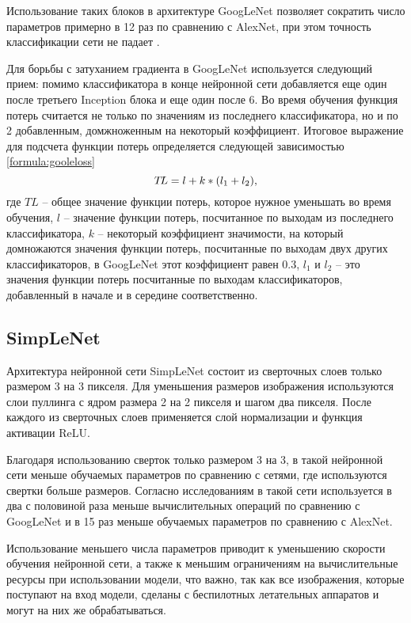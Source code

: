 Использование таких блоков в архитектуре GoogLeNet позволяет сократить число параметров примерно в 12 раз по сравнению с AlexNet, при этом точность классификации сети не падает \cite{googlenet}.

Для борьбы с затуханием градиента в GoogLeNet используется следующий прием: помимо классификатора в конце нейронной сети добавляется еще один после третьего Inception блока и еще один после 6. Во время обучения функция потерь считается не только по значениям из последнего классификатора, но и по 2 добавленным, домжноженным на некоторый коэффициент. Итоговое выражение для подсчета функции потерь определяется следующей зависимостью \ref{formula:gooleloss}
\begin{equation}\label{formula:gooleloss}
T\!L = l + k * (l_{\rm{1}} + l_{\rm{2}}),
\end{equation}
где $T\!L$ -- общее значение функции потерь, которое нужное уменьшать во время обучения, $l$ -- значение функции потерь, посчитанное по выходам из последнего классификатора, $k$ -- некоторый коэффициент значимости, на который домножаются значения функции потерь, посчитанные по выходам двух других классификаторов, в GoogLeNet этот коэффициент равен 0.3, $l_1$ и $l_2$ -- это значения функции потерь посчитанные по выходам классификаторов, добавленный в начале и в середине соответственно.


\subsection{SimpLeNet}
Архитектура нейронной сети SimpLeNet состоит из сверточных слоев только размером 3 на 3 пикселя. Для уменьшения размеров изображения используются слои пуллинга с ядром размера 2 на 2 пикселя и шагом два пикселя. После каждого из сверточных слоев применяется слой нормализации и функция активации ReLU.

Благодаря использованию сверток только размером 3 на 3, в такой нейронной сети меньше обучаемых параметров по сравнению с сетями, где используются свертки больше размеров. Согласно исследованиям \cite{mobilenets} в такой сети используется в два с половиной раза меньше вычислительных операций по сравнению с GoogLeNet и в 15 раз меньше обучаемых параметров по сравнению с AlexNet.

Использование меньшего числа параметров приводит к уменьшению скорости обучения нейронной сети, а также к меньшим ограничениям на вычислительные ресурсы при использовании модели, что важно, так как все изображения, которые поступают на вход модели, сделаны с беспилотных летательных аппаратов и могут на них же обрабатываться.

